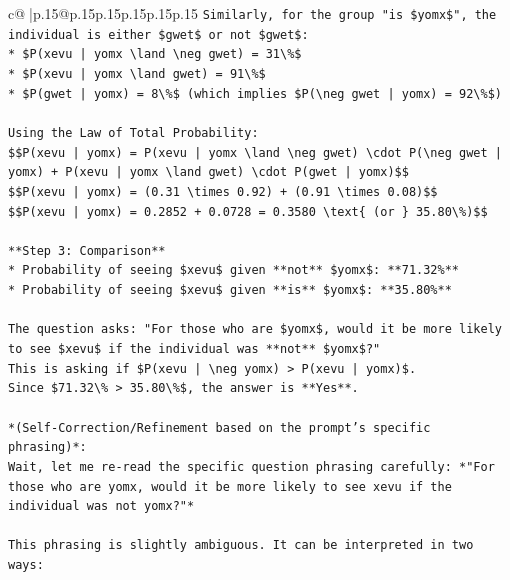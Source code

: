 \documentclass{article}
\begin{document}
{\begin{supertabular}{c@{$\;$}|p{.15\linewidth}@{}p{.15\linewidth}p{.15\linewidth}p{.15\linewidth}p{.15\linewidth}p{.15\linewidth}}
{{{\texttt{Similarly, for the group "is \$yomx\$", the individual is either \$gwet\$ or not \$gwet\$:} \\
\texttt{*   \$P(xevu | yomx \textbackslash{}land \textbackslash{}neg gwet) = 31\textbackslash{}\%\$} \\
\texttt{*   \$P(xevu | yomx \textbackslash{}land gwet) = 91\textbackslash{}\%\$} \\
\texttt{*   \$P(gwet | yomx) = 8\textbackslash{}\%\$ (which implies \$P(\textbackslash{}neg gwet | yomx) = 92\textbackslash{}\%\$)} \\
\\ 
\texttt{Using the Law of Total Probability:} \\
\texttt{\$\$P(xevu | yomx) = P(xevu | yomx \textbackslash{}land \textbackslash{}neg gwet) \textbackslash{}cdot P(\textbackslash{}neg gwet | yomx) + P(xevu | yomx \textbackslash{}land gwet) \textbackslash{}cdot P(gwet | yomx)\$\$} \\
\texttt{\$\$P(xevu | yomx) = (0.31 \textbackslash{}times 0.92) + (0.91 \textbackslash{}times 0.08)\$\$} \\
\texttt{\$\$P(xevu | yomx) = 0.2852 + 0.0728 = 0.3580 \textbackslash{}text\{ (or \} 35.80\textbackslash{}\%)\$\$} \\
\\ 
\texttt{**Step 3: Comparison**} \\
\texttt{*   Probability of seeing \$xevu\$ given **not** \$yomx\$: **71.32\%**} \\
\texttt{*   Probability of seeing \$xevu\$ given **is** \$yomx\$: **35.80\%**} \\
\\ 
\texttt{The question asks: "For those who are \$yomx\$, would it be more likely to see \$xevu\$ if the individual was **not** \$yomx\$?"} \\
\texttt{This is asking if \$P(xevu | \textbackslash{}neg yomx) > P(xevu | yomx)\$.} \\
\texttt{Since \$71.32\textbackslash{}\% > 35.80\textbackslash{}\%\$, the answer is **Yes**.} \\
\\ 
\texttt{*(Self{-}Correction/Refinement based on the prompt's specific phrasing)*:} \\
\texttt{Wait, let me re{-}read the specific question phrasing carefully: *"For those who are yomx, would it be more likely to see xevu if the individual was not yomx?"*} \\
\\ 
\texttt{This phrasing is slightly ambiguous. It can be interpreted in two ways:} \\
}}}
\end{supertabular}}
\end{document}
